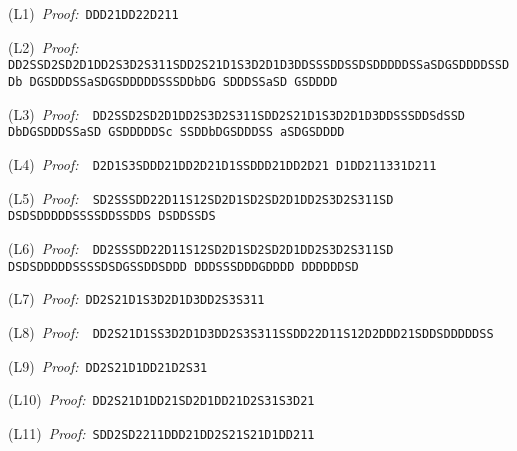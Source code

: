 \documentclass[leqno]{article}
\begin{document}
\begin{flushleft}
\setlength{\parskip}{0.5ex}
\noindent (L1)~{\em Proof:}~{\small\tt DDD21DD22D211}

\noindent (L2)~{\em Proof:}~{\small\tt
DD2SSD2SD2D1DD2S3D\-2S311SDD2S21D1S3D2D1D3DD\-S\-S\-S\-D\-D\-S\-S\-D\-S\-D\-D\-D\-D\-D\-S\-S\-a\-S\-D\-G\-S\-D\-D\-D\-D\-S\-S\-D\-D\-b\-%
D\-G\-S\-D\-D\-D\-S\-S\-a\-S\-D\-G\-S\-D\-D\-D\-D\-D\-S\-S\-S\-D\-D\-b\-D\-G\-%
S\-D\-D\-D\-S\-S\-a\-S\-D\-%
G\-S\-D\-D\-D\-D}

\noindent (L3)~{\em Proof:}~{\small\tt
DD2SSD2SD2D1DD2S3D2S311SDD2S21D1S3D2D1D3DD\-S\-S\-S\-D\-D\-S\-d\-S\-S\-D\-%
D\-b\-D\-G\-S\-D\-D\-D\-S\-S\-a\-S\-D\-%
G\-S\-D\-D\-D\-D\-D\-S\-c\-%
S\-S\-D\-D\-b\-D\-G\-S\-D\-D\-D\-S\-S\-%
a\-S\-D\-G\-S\-D\-D\-D\-D}

\noindent (L4)~{\em Proof:}~{\small\tt
D2D1S3SDDD21DD2D21D1SSDDD21DD2D21\-%
D1DD211331D211}

\noindent (L5)~{\em Proof:}~{\small\tt
SD2SSSDD22D11S12SD2D1SD2SD2D1DD2S3D2S311SD\-%
D\-S\-D\-S\-D\-D\-D\-D\-D\-S\-S\-S\-S\-D\-D\-S\-S\-D\-D\-S\-%
D\-S\-D\-D\-S\-S\-D\-S}

\noindent (L6)~{\em Proof:}~{\small\tt
DD2SSSDD22D11S12SD2D1SD2SD2D1DD2S3D2S311SD\-%
D\-S\-D\-S\-D\-D\-D\-D\-D\-S\-S\-S\-S\-D\-S\-D\-G\-S\-S\-D\-D\-S\-D\-D\-D\-%
D\-D\-D\-S\-S\-S\-D\-D\-D\-G\-D\-D\-D\-D\-%
D\-D\-D\-D\-D\-D\-S\-D}

\noindent (L7)~{\em Proof:}~{\small\tt DD2S21D1S3D2D1D3DD2S3S311}

\noindent (L8)~{\em Proof:}~{\small\tt
DD2S21D1SS3D2D1D3DD2S3S311SSDD22D11S12D2DDD21S\-D\-D\-S\-D\-D\-D\-D\-D\-S\-S}

\noindent (L9)~{\em Proof:}~{\small\tt DD2S21D1DD21D2S31}

\noindent (L10)~{\em Proof:}~{\small\tt DD2S21D1DD21SD2D1DD21D2S31S3D21}

\noindent (L11)~{\em Proof:}~{\small\tt SDD2SD2211DDD21DD2S21S21D1DD211}


\end{flushleft}
\end{document}
